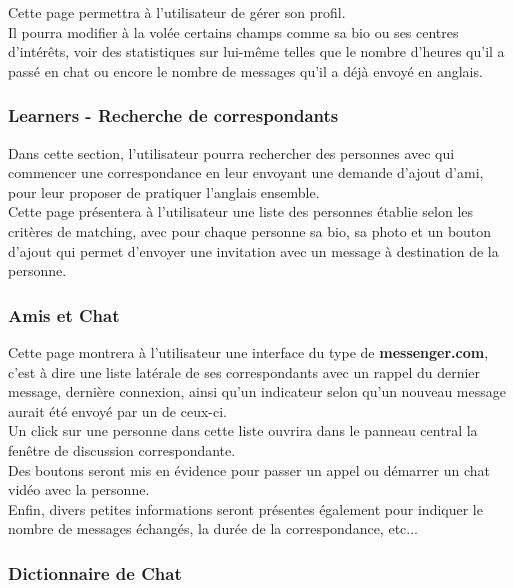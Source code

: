 \documentclass{report}
\begin{document}
			Cette page permettra à l'utilisateur de gérer son profil.\\
			Il pourra modifier à la volée certains champs comme sa bio ou ses centres d'intérêts, voir des statistiques sur lui-même telles que le nombre d'heures qu'il a passé en chat ou encore le nombre de messages qu'il a déjà envoyé en anglais.\\

		\subsubsection{Learners - Recherche de correspondants}

			Dans cette section, l'utilisateur pourra rechercher des personnes avec qui commencer une correspondance en leur envoyant une demande d'ajout d'ami, pour leur proposer de pratiquer l'anglais ensemble.\\

			Cette page présentera à l'utilisateur une liste des personnes établie selon les critères de matching, avec pour chaque personne sa bio, sa photo et un bouton d'ajout qui permet d'envoyer une invitation avec un message à destination de la personne.\\


		\subsubsection{Amis et Chat}

			Cette page montrera à l'utilisateur une interface du type de \textbf{messenger.com}, c'est à dire une liste latérale de ses correspondants avec un rappel du dernier message, dernière connexion, ainsi qu'un indicateur selon qu'un nouveau message aurait été envoyé par un de ceux-ci.\\

			Un click sur une personne dans cette liste ouvrira dans le panneau central la fenêtre de discussion correspondante.\\
			Des boutons seront mis en évidence pour passer un appel ou démarrer un chat vidéo avec la personne.\\
			Enfin, divers petites informations seront présentes également pour indiquer le nombre de messages échangés, la durée de la correspondance, etc...\\

		\subsubsection{Dictionnaire de Chat}
\end{document}
